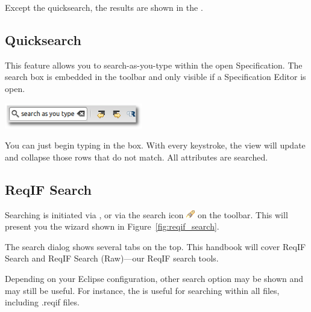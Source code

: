 Except the quicksearch, the results are shown in the .

\subsection{Quicksearch}
\label{sec:quicksearch}

This feature allows you to search-as-you-type within the open Specification.  The search box is embedded in the toolbar and only visible if a Specification Editor is open.

\begin{center}
\includegraphics[height=3em]{../rmf-images/quicksearch.png}
\end{center}

You can just begin typing in the box.  With every keystroke, the view will update and collapse those rows that do not match.  All attributes are searched.

\subsection{ReqIF Search}

Searching is initiated via , or via the search icon \includegraphics[height=1em]{../rmf-images/icons/full/obj16/search.png} on the toolbar.  This will present you the wizard shown in Figure~\ref{fig:reqif_search}.

\begin{info}
The search dialog shows several tabs on the top.  This handbook will cover ReqIF Search and ReqIF Search (Raw)---our ReqIF search tools.  

Depending on your Eclipse configuration, other search option may be shown and may still be useful.  For instance, the  is useful for searching within all files, including .reqif files.
\end{info}

